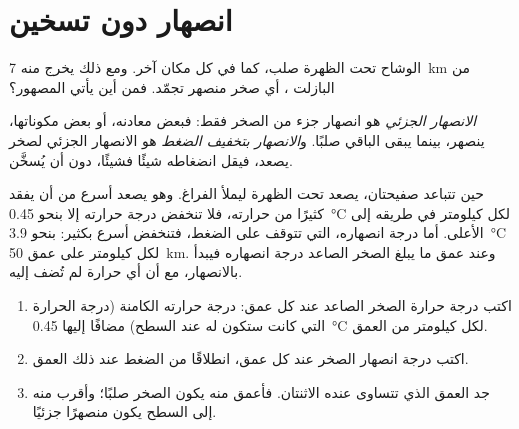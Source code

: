 \section{انصهار دون تسخين}

الوشاح تحت الظهرة  صلب، كما في كل مكان آخر. ومع ذلك يخرج منه
\qty{7}{km} من البازلت ، أي صخر منصهر تجمّد. فمن أين
يأتي المصهور؟

\begin{definition}\label{def:g11:ocean-ridges:partial-melting}
\emph{الانصهار الجزئي} هو انصهار جزء
من الصخر فقط: فبعض معادنه، أو بعض مكوناتها، ينصهر، بينما
يبقى الباقي صلبًا.
و\emph{الانصهار بتخفيف الضغط} هو الانصهار الجزئي لصخر يصعد، فيقل
انضغاطه شيئًا فشيئًا، دون أن يُسخَّن.
\end{definition}

حين تتباعد صفيحتان، يصعد  تحت الظهرة ليملأ
الفراغ. وهو يصعد أسرع من أن يفقد كثيرًا من حرارته، فلا تنخفض درجة حرارته
إلا بنحو \qty{0.45}{\celsius} لكل كيلومتر في طريقه إلى الأعلى. أما درجة
انصهاره، التي تتوقف على الضغط، فتنخفض أسرع بكثير: بنحو
\qty{3.9}{\celsius} لكل كيلومتر على عمق \qty{50}{km}. وعند عمق ما
يبلغ الصخر الصاعد درجة انصهاره فيبدأ بالانصهار، مع أن
أي حرارة لم تُضف إليه.

\begin{method}\label{met:g11:ocean-ridges:melting}
\begin{enumerate}
  \item اكتب درجة حرارة الصخر الصاعد عند كل عمق: درجة حرارته
        الكامنة (درجة الحرارة التي كانت ستكون له عند السطح)
        مضافًا إليها \qty{0.45}{\celsius} لكل كيلومتر من العمق.
  \item اكتب درجة انصهار الصخر عند كل عمق، انطلاقًا من
        الضغط عند ذلك العمق.
  \item جد العمق الذي تتساوى عنده الاثنتان. فأعمق منه يكون الصخر صلبًا؛
        وأقرب منه إلى السطح يكون منصهرًا جزئيًا.
\end{enumerate}
\end{method}

